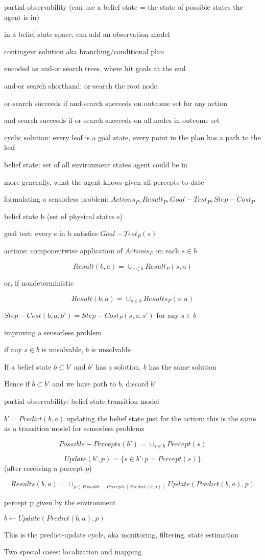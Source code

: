 \documentclass[12pt]{article}
\begin{document}
partial observability (can use a belief state = the state of possible states the agent is in)

in a belief state space, can add an observation model

\noindent
contingent solution aka branching/conditional plan

encoded as and-or search trees, where hit goals at the end

\noindent
and-or search shorthand: or-search the root node

or-search succeeds if and-search succeeds on outcome set for any action

and-search succeeds if or-search succeeds on all nodes in outcome set

\noindent
cyclic solution: every leaf is a goal state, every point in the plan has a path to the leaf

\noindent
belief state: set of all environment states agent could be in

more generally, what the agent knows given all percepts to date

\noindent
formulating a sensorless problem: $Actions_P, Result_P, Goal-Test_P, Step-Cost_P$

belief state b (set of physical states s)

goal test: every s in b satisfies $Goal-Test_P(s)$

actions: componentwise application of $Actions_P$ on each $s \in b$

$$Result(b,a) = \cup_{s \in b} Result_P(s, a)$$

or, if nondeterministic

$$Result(b,a) = \cup_{s \in b} Results_P(s, a)$$

$Step-Cost(b, a, b') = Step-Cost_P(s, a, s')$ for any $s \in b$

\noindent
improving a sensorless problem

if any $s \in b$ is unsolvable, $b$ is unsolvable

If a belief state $b \subset b'$ and $b'$ has a solution, $b$ has the same solution

Hence if $b \subset b'$ and we have path to $b$, discard $b'$

\noindent
partial observability: belief state transition model

$b' = Predict(b, a)$ updating the belief state just for the action: this is the same as a transition model for sensorless problems

$$Possible-Percepts(b') = \cup_{s \in b}Percept(s)$$

$$Update(b', p) = \{s \in b' : p = Percept(s)\}$$ (after receiving a percept $p$)

$$Results(b, a) = \cup_{p \in Possible-Percepts(Predict(b, a))}Update(Predict(b, a), p)$$

percept p given by the environment

\noindent
$b \leftarrow Update(Predict(b, a), p)$

This is the predict-update cycle, aka monitoring, filtering, state estimation

Two special cases: localization and mapping
\end{document}
